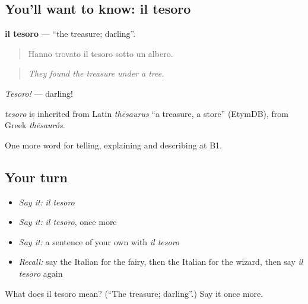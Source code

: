 \subsection*{You'll want to know: il tesoro}
\textbf{il tesoro} — \textquotedblleft{}the treasure; darling\textquotedblright{}.

\begin{quote}
Hanno trovato il tesoro sotto un albero.
\end{quote}

\begin{quote}
\emph{They found the treasure under a tree.}
\end{quote}

\emph{Tesoro!} — darling!

\begin{cousinweb}
\emph{tesoro} is inherited from Latin \emph{thēsaurus} \textquotedblleft{}a treasure, a store\textquotedblright{} (EtymDB), from Greek \emph{thēsaurós}.
\end{cousinweb}

\begin{grammarlens}[title={What you've built}]
One more word for telling, explaining and describing at B1.
\end{grammarlens}

\subsection*{Your turn}
\begin{itemize}
\raggedright
  \item \emph{Say it:} \emph{il tesoro}
  \item \emph{Say it:} \emph{il tesoro}, once more
  \item \emph{Say it:} a sentence of your own with \emph{il tesoro}
  \item \emph{Recall:} say the Italian for the fairy, then the Italian for the wizard, then say \emph{il tesoro} again
\end{itemize}

\begin{tcolorbox}[breakable,colback=teal!4,colframe=teal!35!black,title={Before you move on}]
What does il tesoro mean? (\textquotedblleft{}The treasure; darling\textquotedblright{}.) Say it once more.
\end{tcolorbox}
